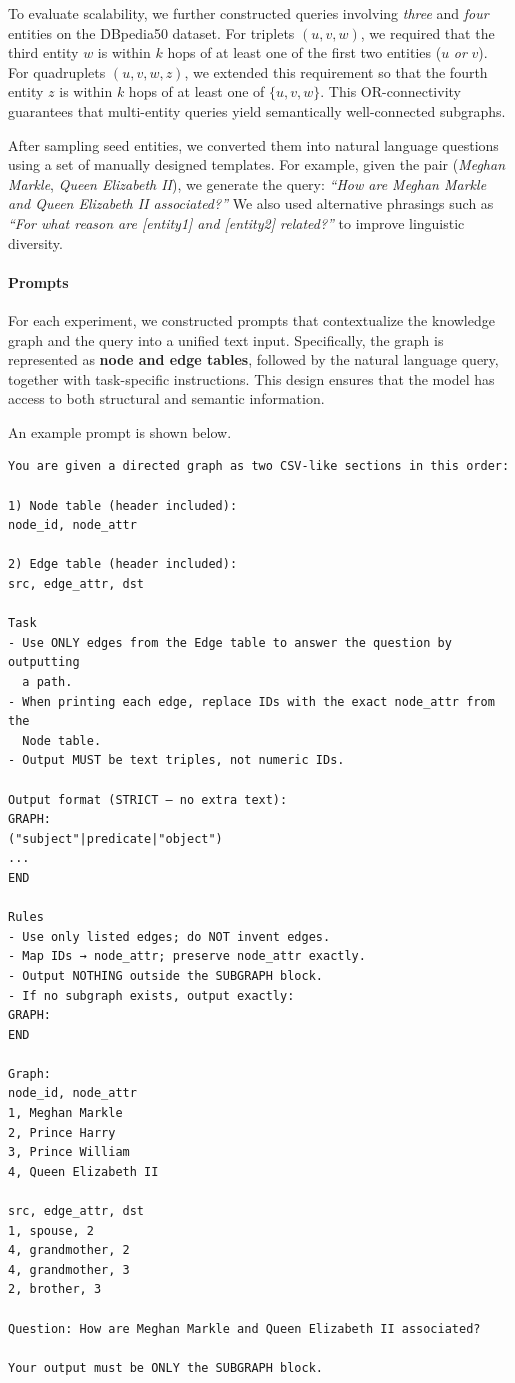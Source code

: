 To evaluate scalability, we further constructed queries involving \textit{three} and \textit{four} entities 
on the DBpedia50 dataset. 
For triplets $(u,v,w)$, we required that the third entity $w$ 
is within $k$ hops of at least one of the first two entities ($u$ \textit{or} $v$). 
For quadruplets $(u,v,w,z)$, we extended this requirement so that 
the fourth entity $z$ is within $k$ hops of at least one of $\{u,v,w\}$. 
This OR-connectivity guarantees that multi-entity queries yield semantically well-connected subgraphs.

After sampling seed entities, we converted them into natural language questions 
using a set of manually designed templates. 
For example, given the pair (\textit{Meghan Markle}, \textit{Queen Elizabeth II}), 
we generate the query: 
\textit{``How are Meghan Markle and Queen Elizabeth II associated?''} 
We also used alternative phrasings such as 
\textit{``For what reason are [entity1] and [entity2] related?''} 
to improve linguistic diversity. 

\paragraph{Prompts} For each experiment, we constructed prompts that contextualize the knowledge graph and the query into a unified text input.  
Specifically, the graph is represented as \textbf{node and edge tables}, followed by the natural language query, together with task-specific instructions.  
This design ensures that the model has access to both structural and semantic information.  

An example prompt is shown below.
{\small
\begin{verbatim}
You are given a directed graph as two CSV-like sections in this order:

1) Node table (header included):
node_id, node_attr

2) Edge table (header included):
src, edge_attr, dst

Task
- Use ONLY edges from the Edge table to answer the question by outputting 
  a path.
- When printing each edge, replace IDs with the exact node_attr from the 
  Node table.
- Output MUST be text triples, not numeric IDs.

Output format (STRICT — no extra text):
GRAPH:
("subject"|predicate|"object")
...
END

Rules
- Use only listed edges; do NOT invent edges.
- Map IDs → node_attr; preserve node_attr exactly.
- Output NOTHING outside the SUBGRAPH block.
- If no subgraph exists, output exactly:
GRAPH:
END

Graph:
node_id, node_attr
1, Meghan Markle
2, Prince Harry
3, Prince William
4, Queen Elizabeth II

src, edge_attr, dst
1, spouse, 2
4, grandmother, 2
4, grandmother, 3
2, brother, 3

Question: How are Meghan Markle and Queen Elizabeth II associated?

Your output must be ONLY the SUBGRAPH block.
\end{verbatim}
}

